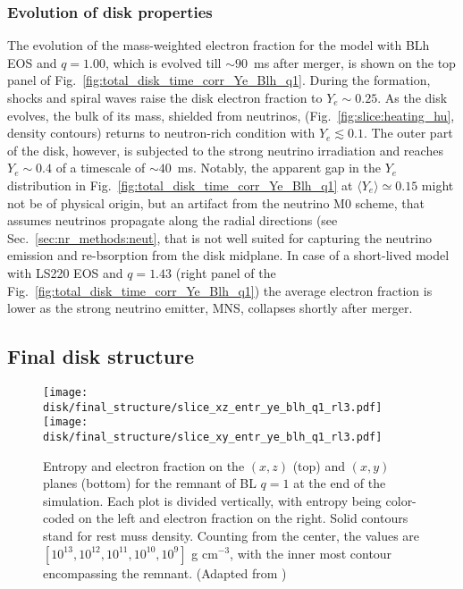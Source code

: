 \subsubsection*{Evolution of disk properties}

The evolution of the mass-weighted electron fraction for the model with
BLh \ac{EOS} and $q=1.00$, which is evolved till $\sim 90$~ms after merger, 
is shown on the top panel of Fig.~\ref{fig:total_disk_time_corr_Ye_Blh_q1}.
%
During the formation, shocks and spiral waves raise the disk electron fraction to
$Y_e\sim0.25$. As the disk evolves, the bulk of its mass, shielded from neutrinos, 
(Fig.~\ref{fig:slice:heating_hu}, density contours) returns to neutron-rich 
condition with $Y_e\lesssim0.1$. The outer part of the disk, however, is 
subjected to the strong neutrino irradiation and reaches $Y_e\sim0.4$ of a 
timescale of ${\sim}40$~ms.
Notably, the apparent gap in the $Y_e$ distribution in 
Fig.~\ref{fig:total_disk_time_corr_Ye_Blh_q1} at $\langle Y_e \rangle \simeq 0.15$ 
might not be of physical origin, but an artifact from the neutrino M0 scheme, 
that assumes neutrinos propagate along the radial directions
(see Sec.~\ref{sec:nr_methods:neut}, that is not well suited for capturing the 
neutrino emission and re-bsorption from the disk midplane.
In case of a short-lived model with LS220 \ac{EOS} and $q=1.43$ 
(right panel of the Fig.~\ref{fig:total_disk_time_corr_Ye_Blh_q1})
the average electron fraction is lower as the strong neutrino emitter,
\ac{MNS}, collapses shortly after merger. 
%




\subsection{Final disk structure}

\begin{figure}[t]
    \centering
    \texttt{[image: disk/final\_structure/slice\_xz\_entr\_ye\_blh\_q1\_rl3.pdf]}
    \texttt{[image: disk/final\_structure/slice\_xy\_entr\_ye\_blh\_q1\_rl3.pdf]}
    \caption{Entropy and electron fraction on the $(x,z)$ (top) and
        $(x,y)$ planes (bottom) for the remnant of BL $q=1$ at the end
        of the simulation. Each plot is divided vertically, with entropy
        being color-coded on the left and electron fraction on the
        right. Solid contours stand for rest muss density. Counting from
        the center, the values are $[10^{13}, 10^{12}, 10^{11}, 10^{10},
        10^{9}]$ g cm$^{-3}$, with the inner most contour encompassing
        the remnant.
        (Adapted from \citet{Nedora:2020pak})
    }  
    \label{fig:snapshots_xy_ye_entr}
\end{figure}


